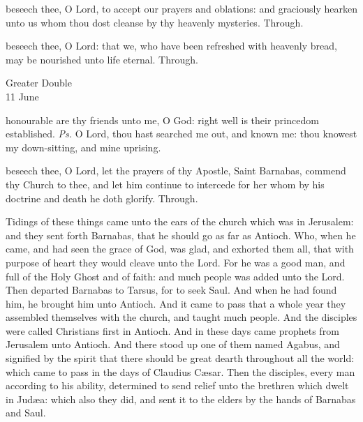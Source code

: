 
\secret
{} beseech thee, O Lord, to accept our prayers and oblations: and graciously hearken unto us whom thou dost cleanse by thy heavenly mysteries. Through.


\postcommunion
{} beseech thee, O Lord: that we, who have been refreshed with heavenly bread, may be nourished unto life eternal. Through.


\clearpage

\begin{inhead}
    {Greater Double\\
11 June}
\end{inhead}

\properantiphonfix

\introit
{} honourable are thy friends unto me, O God: right well is their princedom established. \textit{Ps.} O Lord, thou hast searched me out, and known me: thou knowest my down-sitting, and mine uprising.

\collect
 beseech thee, O Lord, let the prayers of thy Apostle, Saint Barnabas, commend thy Church to thee, and let him continue to intercede for her whom by his doctrine and death he doth glorify. Through.

 Tidings of these things came unto the ears of the church which was in Jerusalem: and they sent forth Barnabas, that he should go as far as Antioch. Who, when he came, and had seen the grace of God, was glad, and exhorted them all, that with purpose of heart they would cleave unto the Lord. For he was a good man, and full of the Holy Ghost and of faith: and much people was added unto the Lord. Then departed Barnabas to Tarsus, for to seek Saul. And when he had found him, he brought him unto Antioch. And it came to pass that a whole year they assembled themselves with the church, and taught much people. And the disciples were called Christians first in Antioch. And in these days came prophets from Jerusalem unto Antioch. And there stood up one of them named Agabus, and signified by the spirit that there should be great dearth throughout all the world: which came to pass in the days of Claudius C{\ae}sar. Then the disciples, every man according to his ability, determined to send relief unto the brethren which dwelt in Jud{\ae}a: which also they did, and sent it to the elders by the hands of Barnabas and Saul.

